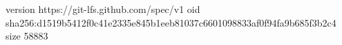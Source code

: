 version https://git-lfs.github.com/spec/v1
oid sha256:d1519b5412f0c41e2335e845b1eeb81037c6601098833af0f94fa9b685f3b2c4
size 58883
